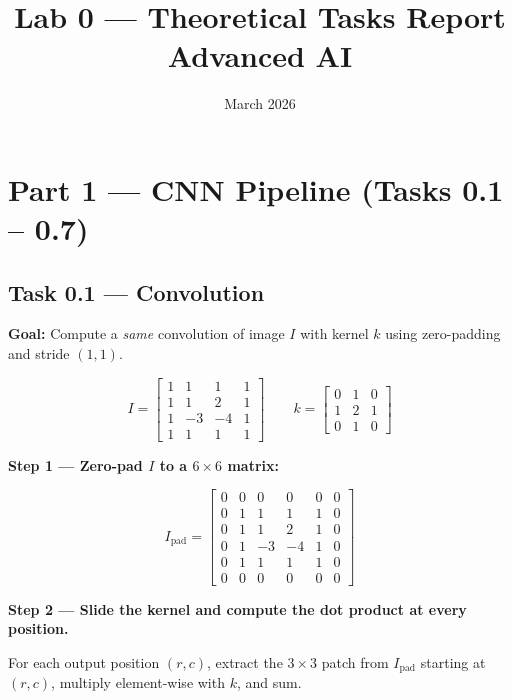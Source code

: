 \documentclass[12pt,a4paper]{article}
\title{\textbf{Lab 0 — Theoretical Tasks Report}\\[0.4em]
       \large Advanced AI}
\author{}
\date{March 2026}
\begin{document}
\maketitle
\tableofcontents
\newpage

\section{Part 1 — CNN Pipeline (Tasks 0.1 – 0.7)}

\subsection{Task 0.1 — Convolution}

\textbf{Goal:} Compute a \emph{same} convolution of image $I$ with kernel $k$
using zero-padding and stride $(1,1)$.

\[
I =
\begin{bmatrix}
1 &  1 &  1 & 1\\
1 &  1 &  2 & 1\\
1 & -3 & -4 & 1\\
1 &  1 &  1 & 1
\end{bmatrix}
\qquad
k =
\begin{bmatrix}
0 & 1 & 0\\
1 & 2 & 1\\
0 & 1 & 0
\end{bmatrix}
\]

\textbf{Step 1 — Zero-pad $I$ to a $6\times6$ matrix:}

\[
I_{\text{pad}} =
\begin{bmatrix}
0 &  0 &  0 &  0 & 0 & 0\\
0 &  1 &  1 &  1 & 1 & 0\\
0 &  1 &  1 &  2 & 1 & 0\\
0 &  1 & -3 & -4 & 1 & 0\\
0 &  1 &  1 &  1 & 1 & 0\\
0 &  0 &  0 &  0 & 0 & 0
\end{bmatrix}
\]

\textbf{Step 2 — Slide the kernel and compute the dot product at every position.}

For each output position $(r, c)$, extract the $3\times3$ patch from $I_{\text{pad}}$
starting at $(r, c)$, multiply element-wise with $k$, and sum.
\end{document}
